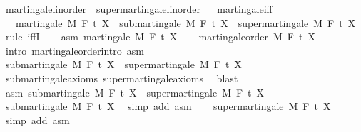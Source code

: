 \begin{isabellebody}
%
\endisadelimproof
\isanewline
{}\isamarkupfalse%
\ martingale{\isacharunderscore}{\kern0pt}linorder\ {\isasymsubseteq}\ supermartingale{\isacharunderscore}{\kern0pt}linorder%
\isadelimproof
\ %
\endisadelimproof
%
\isatagproof
\isacommand{{\isachardot}{\kern0pt}{\isachardot}{\kern0pt}}\isamarkupfalse%
%
\endisatagproof
{\isafoldproof}%
%
\isadelimproof
%
\endisadelimproof
\isanewline
\isanewline
{}\isamarkupfalse%
\ martingale{\isacharunderscore}{\kern0pt}iff{\isacharcolon}{\kern0pt}\ \isanewline
\ \ \ {\isachardoublequoteopen}martingale\ M\ F\ t\ X\ {\isasymlongleftrightarrow}\ submartingale\ M\ F\ t\ X\ {\isasymand}\ supermartingale\ M\ F\ t\ X{\isachardoublequoteclose}\isanewline
%
\isadelimproof
%
\endisadelimproof
%
\isatagproof
{}\isamarkupfalse%
\ {\isacharparenleft}{\kern0pt}rule\ iffI{\isacharparenright}{\kern0pt}\isanewline
\ \ \isamarkupfalse%
\ asm{\isacharcolon}{\kern0pt}\ {\isachardoublequoteopen}martingale\ M\ F\ t\ X{\isachardoublequoteclose}\isanewline
\ \ \isamarkupfalse%
\ martingale{\isacharunderscore}{\kern0pt}order\ M\ F\ t\ X\ \isamarkupfalse%
\ {\isacharparenleft}{\kern0pt}intro\ martingale{\isacharunderscore}{\kern0pt}order{\isachardot}{\kern0pt}intro\ asm{\isacharparenright}{\kern0pt}\isanewline
\ \ \isamarkupfalse%
\ {\isachardoublequoteopen}submartingale\ M\ F\ t\ X\ {\isasymand}\ supermartingale\ M\ F\ t\ X{\isachardoublequoteclose}\ \isamarkupfalse%
\ submartingale{\isacharunderscore}{\kern0pt}axioms\ supermartingale{\isacharunderscore}{\kern0pt}axioms\ \isamarkupfalse%
\ blast\isanewline
{}\isamarkupfalse%
\isanewline
\ \ \isamarkupfalse%
\ asm{\isacharcolon}{\kern0pt}\ {\isachardoublequoteopen}submartingale\ M\ F\ t\ X\ {\isasymand}\ supermartingale\ M\ F\ t\ X{\isachardoublequoteclose}\isanewline
\ \ \isamarkupfalse%
\ submartingale\ M\ F\ t\ X\ \isamarkupfalse%
\ {\isacharparenleft}{\kern0pt}simp\ add{\isacharcolon}{\kern0pt}\ asm{\isacharparenright}{\kern0pt}\isanewline
\ \ \isamarkupfalse%
\ supermartingale\ M\ F\ t\ X\ \isamarkupfalse%
\ {\isacharparenleft}{\kern0pt}simp\ add{\isacharcolon}{\kern0pt}\ asm{\isacharparenright}{\kern0pt}\isanewline

\end{isabellebody}
